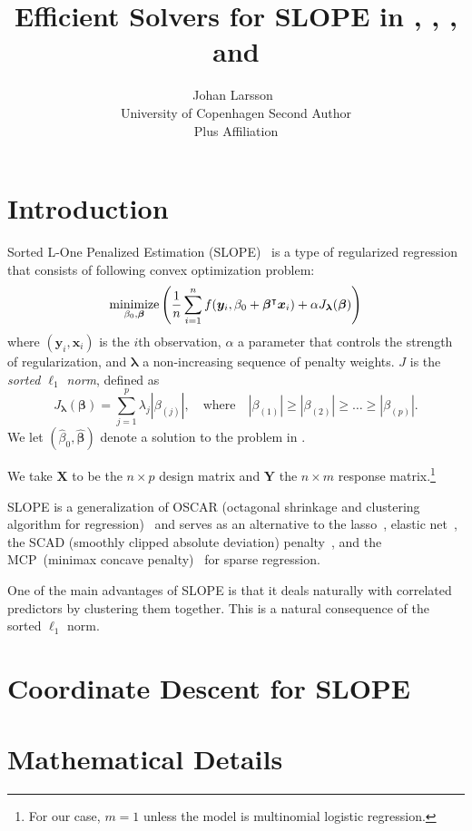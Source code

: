 \documentclass[article]{jss}
\author{Johan Larsson~\orcidlink{0000-0002-4029-5945}\\University of Copenhagen
   \And Second Author\\Plus Affiliation}
\title{Efficient Solvers for SLOPE in \proglang{R}, \proglang{Python}, \proglang{Julia}, and \proglang{C++}}
\let\Cref\crtCref
\begin{document}
\section{Introduction}

Sorted L-One Penalized Estimation
(SLOPE)~\citep{bogdan2013,zeng2014,bogdan2015} is a type of
regularized regression that consists of following convex optimization problem:
\begin{equation}
  \label{eq:slope}
  \operatorname*{minimize}_{\beta_0,\bm{\beta}} \left( \frac{1}{n} \sum_{i=1}^n f(\bm{y}_i, \beta_0 + \bm{\beta}^\intercal \bm{x}_i) + \alpha J_{\bm{\lambda}}(\bm{\beta})\right)
\end{equation}
where \((\bm{y}_i, \bm{x}_i)\) is the \(i\)th observation, \(\alpha\) a parameter
that controls the strength of regularization, and \(\bm{\lambda}\) a non-increasing sequence of penalty weights. \(J\) is the
\emph{sorted $\ell_1$ norm}, defined as
\begin{equation}
  \label{eq:sl1}
  J_{\bm{\lambda}}(\bm{\beta}) = \sum_{j=1}^p \lambda_j |\beta_{(j)}|, \quad
  \text{where}\quad |\beta_{(1)}| \geq |\beta_{(2)}| \geq \ldots \geq
  |\beta_{(p)}|.
\end{equation}
We let \((\hat{\beta}_0, \hat{\bm{\beta}})\) denote a solution to the problem in \Cref{eq:slope}.

We take \(\bm{X}\) to be the \(n \times p\) design matrix and \(\bm{Y}\) the
\(n \times m\) response matrix.\footnote{For our case, \(m = 1\) unless
  the model is multinomial logistic regression.}

SLOPE is a generalization of OSCAR (octagonal shrinkage and clustering
algorithm for regression)~\citep{bondell2008} and serves as an alternative to the
lasso~\citep{santosa1986,donoho1994,donoho1995,tibshirani1996}, elastic
net~\citep{zou2005}, the SCAD (smoothly clipped absolute deviation)
penalty~\citep{fan2001}, and the MCP~(minimax concave
penalty)~\citep{zhang2010} for sparse regression.

One of the main advantages of SLOPE is that it deals naturally with
correlated predictors by clustering them together. This is a natural
consequence of the sorted \(\ell_1\) norm.

\section{Coordinate Descent for SLOPE}

\section{Mathematical Details}
\end{document}
